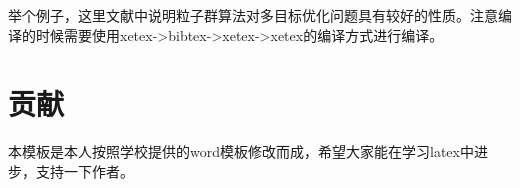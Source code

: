 \documentclass{suesreport}
\begin{document}
    举个例子，这里文献\citet{PSO_ZhangLibiao2004}中说明粒子群算法对多目标优化问题具有较好的性质。注意编译的时候需要使用xetex->bibtex->xetex->xetex的编译方式进行编译。
    \section{贡献}
    本模板是本人按照学校提供的word模板修改而成，希望大家能在学习latex中进步，支持一下作者。

    
    \nocite{*}
    
\end{document}
